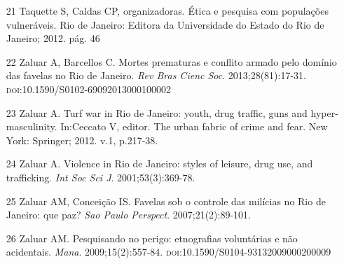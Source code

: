 \documentclass{article}
\begin{document}
\begin{itemize}
\item[21] Taquette S, Caldas CP, organizadoras. Ética e pesquisa com populações
vulneráveis. Rio de Janeiro: Editora da Universidade do Estado do Rio de
Janeiro; 2012. pág. 46

\item[22] Zaluar A, Barcellos C. Mortes prematuras e conflito armado pelo
domínio das favelas no Rio de Janeiro. \textit{Rev Bras Cienc Soc}. 2013;28(81):17-31. \textsc{doi}:10.1590/S0102-69092013000100002

\item[23] Zaluar A. Turf war in Rio de Janeiro: youth, drug traffic, guns and
hyper-masculinity. In:Ceccato V, editor. The urban fabric of crime and fear. New
York: Springer; 2012. v.1, p.217-38.

\item[24] Zaluar A. Violence in Rio de Janeiro: styles of leisure, drug use, and
trafficking. \textit{Int Soc Sci J}. 2001;53(3):369-78.

\item[25] Zaluar AM, Conceição IS. Favelas sob o controle das milícias no Rio de
Janeiro: que paz? \textit{Sao Paulo Perspect}. 2007;21(2):89-101.

\item[26] Zaluar AM. Pesquisando no perigo: etnografias voluntárias e não
acidentais. \textit{Mana}. 2009;15(2):557-84. \textsc{doi}:10.1590/S0104-93132009000200009

\end{itemize}


\end{document}
